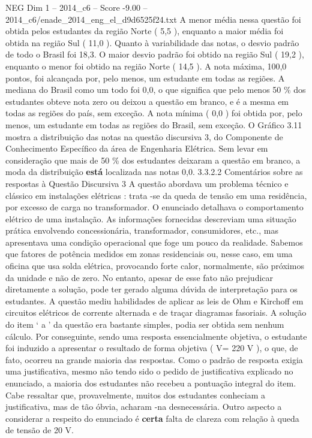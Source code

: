 \begin{textsample}{NEG Dim 1 – 2014\_c6 – Score -9.00 – 2014\_c6/enade\_2014\_eng\_el\_d9d6525f24.txt}
A menor média nessa questão foi obtida pelos estudantes da região Norte ( 5,5 ), enquanto a maior média foi obtida na região Sul ( 11,0 ).
Quanto à variabilidade das notas, o desvio padrão de todo o Brasil foi 18,3.
O maior desvio padrão foi obtido na região Sul ( 19,2 ), enquanto o menor foi obtido na região Norte ( 14,5 ).
A nota máxima, 100,0 pontos, foi alcançada por, pelo menos, um estudante em todas as regiões.
A mediana do Brasil como um todo foi 0,0, o que significa que pelo menos 50 \% dos estudantes obteve nota zero ou deixou a questão em branco, e é a mesma em todas as regiões do país, sem exceção.
A nota mínima ( 0,0 ) foi obtida por, pelo menos, um estudante em todas as regiões do Brasil, sem exceção.
O Gráfico 3.11 mostra a distribuição das notas na questão discursiva 3, do Componente de Conhecimento Específico da área de Engenharia Elétrica.
Sem levar em consideração que mais de 50 \% dos estudantes deixaram a questão em branco, a moda da distribuição \textbf{está} localizada nas notas 0,0. 3.3.2.2 Comentários sobre as respostas à Questão Discursiva 3 A questão abordava um problema técnico e clássico em instalações elétricas : trata -se da queda de tensão em uma residência, por excesso de carga no transformador.
O enunciado detalhava o comportamento elétrico de uma instalação.
As informações fornecidas descreviam uma situação prática envolvendo concessionária, transformador, consumidores, etc., mas apresentava uma condição operacional que foge um pouco da realidade.
Sabemos que fatores de potência medidos em zonas residenciais ou, nesse caso, em uma oficina que usa solda elétrica, provocando forte calor, normalmente, são próximos da unidade e não de zero.
No entanto, apesar de esse fato não prejudicar diretamente a solução, pode ter gerado alguma dúvida de interpretação para os estudantes.
A questão mediu habilidades de aplicar as leis de Ohm e Kirchoff em circuitos elétricos de corrente alternada e de traçar diagramas fasoriais.
A solução do item ‘ a ’ da questão era bastante simples, podia ser obtida sem nenhum cálculo.
Por conseguinte, sendo uma resposta essencialmente objetiva, o estudante foi induzido a apresentar o resultado de forma objetiva ( V= 220 V ), o que, de fato, ocorreu na grande maioria das respostas.
Como o padrão de resposta exigia uma justificativa, mesmo não tendo sido o pedido de justificativa explicado no enunciado, a maioria dos estudantes não recebeu a pontuação integral do item.
Cabe ressaltar que, provavelmente, muitos dos estudantes conheciam a justificativa, mas de tão óbvia, acharam -na desnecessária.
Outro aspecto a considerar a respeito do enunciado é \textbf{certa} falta de clareza com relação à queda de tensão de 20 V.

\end{textsample}
